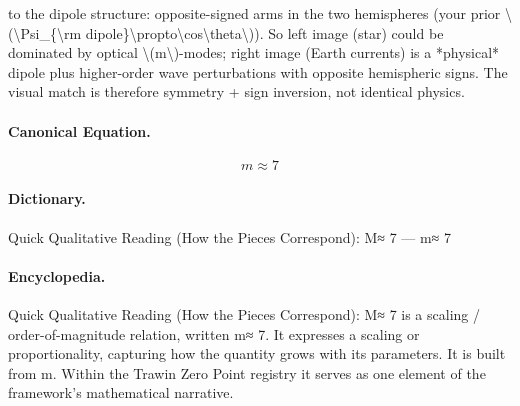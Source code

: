 to the dipole structure: opposite-signed arms in the two hemispheres (your prior \textbackslash{}(\textbackslash{}Psi\_\{\textbackslash{}rm dipole\}\textbackslash{}propto\textbackslash{}cos\textbackslash{}theta\textbackslash{})). So left image (star) could be dominated by optical \textbackslash{}(m\textbackslash{})-modes; right image (Earth currents) is a *physical* dipole plus higher-order wave perturbations with opposite hemispheric signs. The visual match is therefore symmetry + sign inversion, not identical physics.

\paragraph{Canonical Equation.}
\[
m\approx 7
\]

\paragraph{Dictionary.}
Quick Qualitative Reading (How the Pieces Correspond): M≈ 7 — m≈ 7

\paragraph{Encyclopedia.}
Quick Qualitative Reading (How the Pieces Correspond): M≈ 7 is a scaling / order-of-magnitude relation, written m≈ 7. It expresses a scaling or proportionality, capturing how the quantity grows with its parameters. It is built from m. Within the Trawin Zero Point registry it serves as one element of the framework's mathematical narrative.
